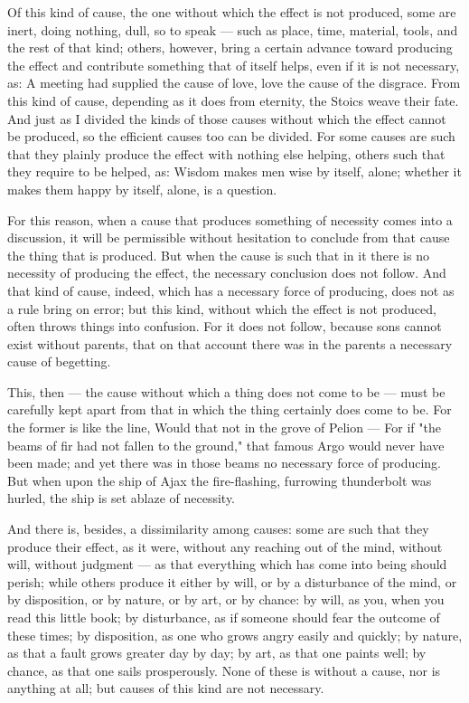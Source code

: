  Of this kind of cause, the one without which the effect is not produced, some are inert, doing nothing, dull, so to speak — such as place, time, material, tools, and the rest of that kind; others, however, bring a certain advance toward producing the effect and contribute something that of itself helps, even if it is not necessary, as: A meeting had supplied the cause of love, love the cause of the disgrace. From this kind of cause, depending as it does from eternity, the Stoics weave their fate. And just as I divided the kinds of those causes without which the effect cannot be produced, so the efficient causes too can be divided. For some causes are such that they plainly produce the effect with nothing else helping, others such that they require to be helped, as: Wisdom makes men wise by itself, alone; whether it makes them happy by itself, alone, is a question.

 For this reason, when a cause that produces something of necessity comes into a discussion, it will be permissible without hesitation to conclude from that cause the thing that is produced. But when the cause is such that in it there is no necessity of producing the effect, the necessary conclusion does not follow. And that kind of cause, indeed, which has a necessary force of producing, does not as a rule bring on error; but this kind, without which the effect is not produced, often throws things into confusion. For it does not follow, because sons cannot exist without parents, that on that account there was in the parents a necessary cause of begetting.

 This, then — the cause without which a thing does not come to be — must be carefully kept apart from that in which the thing certainly does come to be. For the former is like the line, Would that not in the grove of Pelion — For if "the beams of fir had not fallen to the ground," that famous Argo would never have been made; and yet there was in those beams no necessary force of producing. But when upon the ship of Ajax the fire-flashing, furrowing thunderbolt was hurled, the ship is set ablaze of necessity.

 And there is, besides, a dissimilarity among causes: some are such that they produce their effect, as it were, without any reaching out of the mind, without will, without judgment — as that everything which has come into being should perish; while others produce it either by will, or by a disturbance of the mind, or by disposition, or by nature, or by art, or by chance: by will, as you, when you read this little book; by disturbance, as if someone should fear the outcome of these times; by disposition, as one who grows angry easily and quickly; by nature, as that a fault grows greater day by day; by art, as that one paints well; by chance, as that one sails prosperously. None of these is without a cause, nor is anything at all; but causes of this kind are not necessary.

